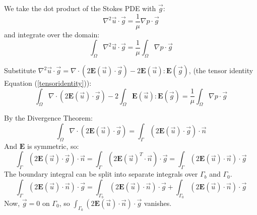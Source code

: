 \documentclass[12pt, a4paper, twoside, openright]{book}
\begin{document}
We take the dot product of the Stokes PDE with $\vec{g}$:
\begin{equation}
\nabla^2 \vec{u} \cdot \vec{g} = \frac{1}{\mu} \nabla p \cdot \vec{g}
\end{equation}
and integrate over the domain:
\begin{equation}
\int_{\Omega} \nabla^2 \vec{u} \cdot \vec{g} = 
\frac{1}{\mu} \int_{\Omega}  \nabla p \cdot \vec{g}
\end{equation}




Substitute  $ \nabla^2 \vec{u} \cdot \vec{g} = \nabla \cdot ( 2 \mathbf{E}(\vec{u}) \cdot \vec{g}) - 2 \mathbf{E}(\vec{u}):\mathbf{E}(\vec{g}) $, (the tensor identity Equation (\ref{tensoridentity})):
\begin{equation}
\int_{\Omega} \nabla \cdot ( 2 \mathbf{E}(\vec{u}) \cdot \vec{g} ) - 
2 \int_{\Omega} \mathbf{E}(\vec{u}) : \mathbf{E}(\vec{g})  = 
\frac{1}{\mu} \int_{\Omega}  \nabla p \cdot \vec{g}
\end{equation}

By the Divergence Theorem:
\begin{equation}
\int_{\Omega} \nabla \cdot ( 2 \mathbf{E}(\vec{u}) \cdot \vec{g} ) =
\int_{\Gamma} ( 2 \mathbf{E}(\vec{u}) \cdot \vec{g} ) \cdot \vec{n}
\end{equation}
And $\mathbf{E}$ is symmetric, so:
\begin{equation}
\int_{\Gamma} ( 2 \mathbf{E}(\vec{u}) \cdot \vec{g} ) \cdot \vec{n} =
\int_{\Gamma} ( 2 \mathbf{E}(\vec{u})^T \cdot \vec{n} ) \cdot \vec{g} =
\int_{\Gamma} ( 2 \mathbf{E}(\vec{u}) \cdot \vec{n} ) \cdot \vec{g}
\end{equation}
The boundary integral can be split into separate integrals over $\Gamma_b$ and $\Gamma_0$.\begin{equation}
\int_{\Gamma} ( 2 \mathbf{E}(\vec{u}) \cdot \vec{n} ) \cdot \vec{g} =
\int_{\Gamma_b} ( 2 \mathbf{E}(\vec{u}) \cdot \vec{n} ) \cdot \vec{g} +
\int_{\Gamma_0} ( 2 \mathbf{E}(\vec{u}) \cdot \vec{n} ) \cdot \vec{g}
\end{equation}
Now, $\vec{g} = 0$ on $\Gamma_0$, so $ \int_{\Gamma_0} ( 2 \mathbf{E}(\vec{u}) \cdot \vec{n} ) \cdot \vec{g} $ vanishes.
\end{document}

